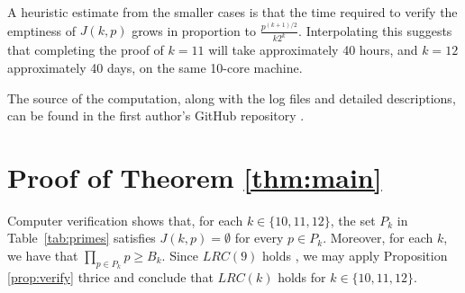 \documentclass[11pt]{amsart}
\theoremstyle{definition}
\theoremstyle{remark}
\begin{document}
A heuristic estimate from the smaller cases is that the time required to verify the emptiness of $J(k, p)$ 
grows in proportion to $\frac{p^{(k+1)/2}}{k2^k}$. Interpolating this suggests that completing the proof of $k=11$ will take approximately 
40 hours, and $k=12$ approximately 40 days, on the same 10-core machine.

The source of the computation, along with the log files and detailed descriptions, 
can be found in the first author's GitHub repository \cite{mycode}.

\section{Proof of Theorem \ref{thm:main}}
\label{sec:result}
Computer verification shows that, for each $k\in\{10,11,12\}$, the set $P_k$ in Table~\ref{tab:primes} satisfies
$J(k,p) = \emptyset$ for every $p\in P_k$. Moreover, for each $k$, we have that $\prod_{p \in P_k} p\geq B_k$. 
Since $LRC(9)$ holds \cite{Trakulthongchai},
we may apply Proposition \ref{prop:verify} thrice and conclude that $LRC(k)$ holds for $k\in\{10,11,12\}$.
\end{document}
